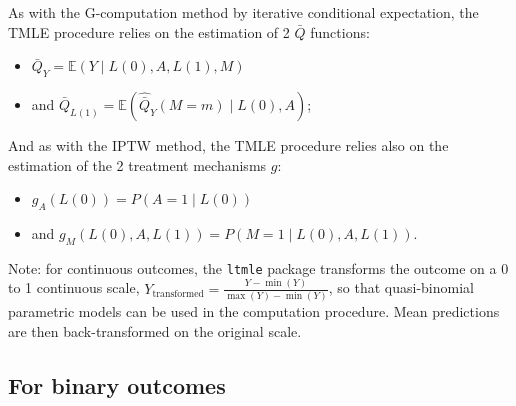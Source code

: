\documentclass[
]{book}
\providecommand{\tightlist}{%
  \setlength{\itemsep}{0pt}\setlength{\parskip}{0pt}}
\begin{document}
As with the G-computation method by iterative conditional expectation, the TMLE procedure relies on the estimation of 2 \(\bar{Q}\) functions:

\begin{itemize}
\tightlist
\item
  \(\bar{Q}_Y = \mathbb{E}(Y \mid L(0),A,L(1),M)\)
\item
  and \(\bar{Q}_{L(1)} = \mathbb{E}(\hat{\bar{Q}}_Y(M=m) \mid L(0),A)\);
\end{itemize}

And as with the IPTW method, the TMLE procedure relies also on the estimation of the 2 treatment mechanisms \(g\):

\begin{itemize}
\tightlist
\item
  \(g_A(L(0)) = P(A=1 \mid L(0))\)
\item
  and \(g_M(L(0),A,L(1)) = P(M=1 \mid L(0),A,L(1))\).
\end{itemize}

Note: for continuous outcomes, the \texttt{ltmle} package transforms the outcome on a 0 to 1 continuous scale, \(Y_\text{transformed} = \frac{Y - \min(Y)}{\max(Y) - \min(Y)}\), so that quasi-binomial parametric models can be used in the computation procedure. Mean predictions are then back-transformed on the original scale.

\hypertarget{for-binary-outcomes}{%
\subsection{For binary outcomes}\label{for-binary-outcomes}}
\end{document}
